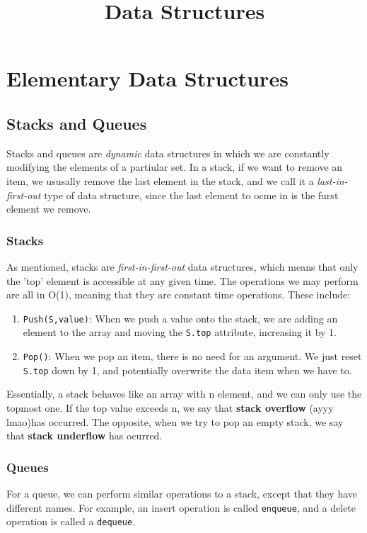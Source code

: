 \documentclass{article}
\title{Data Structures}
\begin{document}
\maketitle
\section{Elementary Data Structures}
\subsection{Stacks and Queues}
Stacks and queues are \textit{dynamic} data structures in which we are constantly modifying the 
elements of a partiular set. In a stack, if we want to remove an item, we ususally remove the 
last element in the stack, and we call it a \textit{last-in-first-out} type of  data structure, 
since the last element to ocme in is the furst element we remove.
\subsubsection{Stacks}
As mentioned, stacks are \textit{first-in-first-out} data structures, which means that only the 'top' element
is accessible at any given time. The operations we may perform are all in O(1), meaning that they are constant
time operations. These include:
\begin{enumerate}
		\item{\texttt{Push(S,value)}}: When we push a value onto the stack, we are adding an element to the array 
				and moving the \texttt{S.top} attribute, increasing it by 1.
		\item{\texttt{Pop()}}: When we pop an item, there is no need for an argument. We just reset \texttt{S.top}
				down by 1, and potentially overwrite the data item when we have to.
\end{enumerate}
Essentially, a stack behaves like an array with n element, and we can only use the topmost one. If the top value
exceeds n, we say that \textbf{stack overflow} (ayyy lmao)has occurred. The opposite, when  we try to pop an 
empty stack, we say that \textbf{stack underflow} has ocurred.
\subsubsection{Queues}
For a queue, we can perform similar operations to a stack, except that they have different names. For example, an insert
operation is called \texttt{enqueue}, and a delete operation is called a \texttt{dequeue}.
\end{document}
